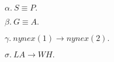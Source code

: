 

$ \alpha.\  S \equiv P. $

$ \beta.\  G \equiv A. $

$ \gamma.\  nynex(1) \rightarrow nynex(2). $

$ \sigma.\  LA \rightarrow WH. $




\bye
